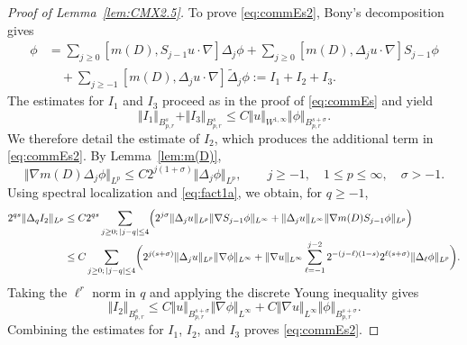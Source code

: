 \documentclass[reqno,11pt,a4paper]{amsart}
\begin{document}
\begin{proof}[Proof of Lemma~\ref{lem:CMX2.5}]
To prove \eqref{eq:commEs2}, Bony's decomposition gives
\begin{align*}
  [m(D),u\cdot\nabla]\phi
  &=
  \sum_{j\geq0}
  [m(D),S_{j-1}u\cdot\nabla]\Delta_j\phi
  + \sum_{j\geq0}
  [m(D),\Delta_j u\cdot\nabla]S_{j-1}\phi
  \\
  &\quad+
  \sum_{j\geq-1}
  [m(D),\Delta_j u\cdot\nabla]\widetilde\Delta_j\phi
  :=I_1+I_2+I_3.
\end{align*}
The estimates for $I_1$ and $I_3$ proceed as in
the proof of \eqref{eq:commEs} and yield
\[
  \Vert I_1\Vert _{B^s_{p,r}}+\Vert I_3\Vert _{B^s_{p,r}}
  \leq
  C\Vert u\Vert _{W^{1,\infty}}\Vert \phi\Vert _{B^{s+\sigma}_{p,r}}.
\]
We therefore detail the estimate of $I_2$,
which produces the additional term in \eqref{eq:commEs2}.
By Lemma~\ref{lem:m(D)},
\begin{equation}\label{eq:fact1a}
  \Vert \nabla m(D)\Delta_j\phi\Vert _{L^p}
  \leq
  C2^{j(1+\sigma)}\Vert \Delta_j\phi\Vert _{L^p},
  \qquad
  j\geq-1,\quad 1\leq p\leq\infty,\quad \sigma>-1.
\end{equation}
Using spectral localization and \eqref{eq:fact1a},
we obtain, for $q\geq-1$,
\begin{align*}
  2^{qs}\Vert \Delta_q I_2\Vert _{L^p}
  &\leq
  C2^{qs}
  \sum_{\substack{j\geq0;\,|j-q|\leq4}}
  \Bigl(
    2^{j\sigma}\Vert \Delta_j u\Vert _{L^p}
    \Vert \nabla S_{j-1}\phi\Vert _{L^\infty}
    +\Vert \Delta_j u\Vert _{L^\infty}
    \Vert \nabla m(D)S_{j-1}\phi\Vert _{L^p}
  \Bigr)
  \\
  & \leq
  C\sum_{\substack{j\geq0;\,|j-q|\leq4}}
  \biggl(
    2^{j(s+\sigma)}\Vert \Delta_j u\Vert _{L^p}
    \Vert \nabla\phi\Vert _{L^\infty}
    +\Vert \nabla u\Vert _{L^\infty}
    \sum_{\ell=-1}^{j-2}
    2^{-(j-\ell)(1-s)}
    2^{\ell(s+\sigma)}\Vert \Delta_\ell\phi\Vert _{L^p}
  \biggr).
\end{align*}
Taking the $\ell^r$ norm in $q$
and applying the discrete Young inequality gives
\[
  \Vert I_2\Vert _{B^s_{p,r}}
  \leq
  C\Vert u\Vert _{B^{s+\sigma}_{p,r}}\Vert \nabla\phi\Vert _{L^\infty}
  +
  C\Vert \nabla u\Vert _{L^\infty}\Vert \phi\Vert _{B^{s+\sigma}_{p,r}}.
\]
Combining the estimates for $I_1$, $I_2$, and $I_3$
proves \eqref{eq:commEs2}.


\end{proof}
\end{document}
